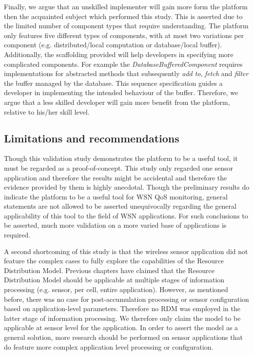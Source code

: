 Finally, we argue that an unskilled implementer will gain more form the platform then the acquainted subject which performed this study. This is asserted due to the limited number of component types that require understanding. The platform only features five different types of components, with at most two variations per component (e.g. distributed/local computation or database/local buffer). Additionally, the scaffolding provided will help developers in specifying more complicated components. For example the \emph{DatabaseBufferedComponent} requires implementations for abstracted methods that subsequently \emph{add to}, \emph{fetch} and \emph{filter} the buffer managed by the database. This sequence specification guides a developer in implementing the intended behaviour of the buffer. Therefore, we argue that a less skilled developer will gain more benefit from the platform, relative to his/her skill level.

\subsection{Limitations and recommendations}
Though this validation study demonstrates the platform to be a useful tool, it must be regarded as a proof-of-concept. This study only regarded one sensor application and therefore the results might be accidental and therefore the evidence provided by them is highly anecdotal. Though the preliminary results do indicate the platform to be a useful tool for WSN QoS monitoring, general statements are not allowed to be asserted unequivocally regarding the general applicability of this tool to the field of WSN applications. For such conclusions to be asserted, much more validation on a more varied base of applications is required.

A second shortcoming of this study is that the \sensit wireless sensor application did not feature the complex cases to fully explore the capabilities of the Resource Distribution Model. Previous chapters have claimed that the Resource Distribution Model should be applicable at multiple stages of information processing (e.g. sensor, per cell, entire application). However, as mentioned before, there was no case for post-accumulation processing or sensor configuration based on application-level parameters. Therefore no RDM was employed in the latter stage of information processing. We therefore only claim the model to be applicable at sensor level for the \sensit application. In order to assert the model as a general solution, more research should be performed on sensor applications that do feature more complex application level processing or configuration.

